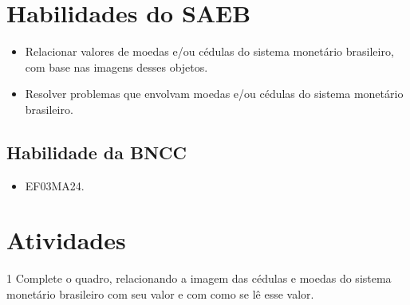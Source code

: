 \section*{Habilidades do SAEB}

\begin{itemize}
\item Relacionar valores de moedas e/ou cédulas do sistema monetário
brasileiro, com base nas imagens desses objetos.

\item Resolver problemas que envolvam moedas e/ou cédulas do sistema
monetário brasileiro.
\end{itemize}

\subsection{Habilidade da BNCC}

\begin{itemize}
  \item 
 EF03MA24.
\end{itemize}


\pagebreak

\section*{Atividades}

\num{1} Complete o quadro, relacionando a imagem das cédulas e moedas do
sistema monetário brasileiro com seu valor e com como se lê esse valor.

